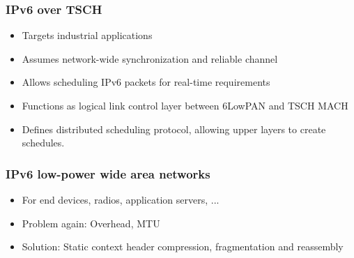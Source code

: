 \subsubsection{IPv6 over TSCH}

\begin{itemize}
		\item Targets industrial applications
		\item Assumes network-wide synchronization and reliable channel
		\item Allows scheduling IPv6 packets for real-time requirements
		\item Functions as logical link control layer between 6LowPAN and TSCH MACH
		\item Defines distributed scheduling protocol, allowing upper layers to
				create schedules.
\end{itemize}

\subsubsection{IPv6 low-power wide area networks}

\begin{itemize}
		\item For end devices, radios, application servers, ...
		\item Problem again: Overhead, MTU
		\item Solution: Static context header compression, fragmentation and reassembly
\end{itemize}
